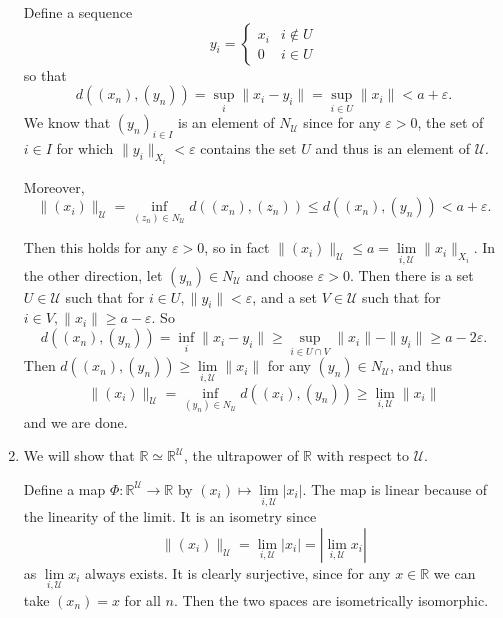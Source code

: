 \documentclass[11pt, reqno]{article}
\theoremstyle{plain}
\theoremstyle{definition}
\theoremstyle{remark}
\renewcommand{\epsilon}{\varepsilon}
\newcommand{\RR}{\mathbb{R}}
\begin{document}
\begin{enumerate}
    Define a sequence 
    \[
        y_i = \begin{cases}x_i & i \notin U\\ 0 & i \in U\end{cases}
    \]
    so that 
    \[
        d((x_n),(y_n)) = \sup\limits_{i} \|x_i - y_i\| = \sup\limits_{i \in U} \|x_i\| < a + \epsilon.
    \]
    We know that $(y_n)_{i \in I}$ is an element of $N_\mathcal{U}$ since for any $\epsilon > 0$, the set of $i \in I$ for which 
    $\|y_i\|_{X_i} < \epsilon$ contains the set $U$ and thus is an element of $\mathcal{U}$. 

    Moreover, 
    \[
        \|(x_i)\|_{\mathcal{U}} = \inf\limits_{(z_n) \in N_\mathcal{U}} d((x_n), (z_n)) \leq d((x_n), (y_n)) < a + \epsilon.
    \]

    Then this holds for any $\epsilon > 0$, so in fact $\|(x_i)\|_\mathcal{U} \leq a = \lim\limits_{i, \mathcal{U}}\|x_i\|_{X_i}$.
    \bigbreak
    In the other direction, let $(y_n) \in N_{\mathcal{U}}$ and choose $\epsilon > 0$. Then there is a set 
    $U \in \mathcal{U}$ such that for $i \in U, \|y_i\| < \epsilon$, and a set $V \in \mathcal{U}$ such that 
    for $i \in V, \|x_i\| \geq a - \epsilon$. So
    \[
        d((x_n), (y_n)) = \inf\limits_i \|x_i - y_i\| \geq \sup\limits_{i \in U \cap V} \|x_i\| - \|y_i\|
        \geq a - 2\epsilon.
    \]
    Then $d((x_n), (y_n)) \geq \lim\limits_{i, \mathcal{U}} \|x_i\|$ for any $(y_n) \in N_\mathcal{U}$,
    and thus 
    \[
        \|(x_i)\|_{\mathcal{U}} = \inf\limits_{(y_n) \in N_\mathcal{U}} d((x_i), (y_n)) \geq \lim\limits_{i, \mathcal{U}} \|x_i\|
    \]
    and we are done.

    \item We will show that $\RR \simeq \RR^\mathcal{U}$, the ultrapower of $\RR$ with respect to $\mathcal{U}$.
    
    Define a map $\Phi: \RR^\mathcal{U} \rightarrow \RR$ by $(x_i) \mapsto \lim\limits_{i, \mathcal{U}}|x_i|$. The map
    is linear because of the linearity of the limit. It is an isometry since
    \[
        \|(x_i)\|_\mathcal{U} = \lim\limits_{i, \mathcal{U}}|x_i| = |\lim\limits_{i, \mathcal{U}}x_i|
    \]
    as $\lim\limits_{i, \mathcal{U}}x_i$ always exists. It is clearly surjective, since for any $x \in \RR$ 
    we can take $(x_n) = x$ for all $n$. Then the two spaces are isometrically isomorphic.
\end{enumerate}
\end{document}
